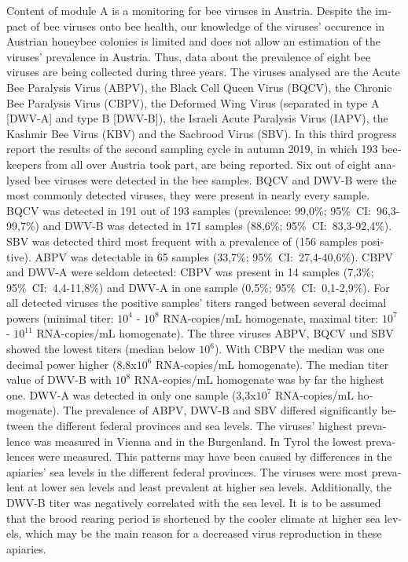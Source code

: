 \begin{otherlanguage}{english}

Content of module A is a monitoring for bee viruses in Austria. Despite the impact of bee viruses onto bee health, our knowledge of the viruses' occurence in Austrian honeybee colonies is limited and does not allow an estimation of the viruses' prevalence in Austria. Thus, data about the prevalence of eight bee viruses are being collected during three years. The viruses analysed are the Acute Bee Paralysis Virus (ABPV), the Black Cell Queen Virus (BQCV), the Chronic Bee Paralysis Virus (CBPV), the Deformed Wing Virus (separated in type A [DWV-A] and type B [DWV-B]), the Israeli Acute Paralysis Virus (IAPV), the Kashmir Bee Virus (KBV) and the Sacbrood Virus (SBV).
\newline
In this third progress report the results of the second sampling cycle in autumn 2019, in which 193 beekeepers from all over Austria took part, are being reported. Six out of eight analysed bee viruses were detected in the bee samples. BQCV and DWV-B were the most commonly detected viruses, they were present in nearly every sample. BQCV was detected in 191 out of 193 samples (prevalence: 99,0\%; 95\%~CI:~96,3-99,7\%) and DWV-B was detected in 171 samples (88,6\%; 95\%~CI:~83,3-92,4\%). SBV was detected third most frequent with a prevalence of  (156 samples positive). ABPV was detectable in 65 samples (33,7\%; 95\%~CI:~27,4-40,6\%). CBPV and DWV-A were seldom detected: CBPV was present in 14 samples (7,3\%; 95\%~CI:~4,4-11,8\%) and DWV-A in one sample (0,5\%; 95\%~CI:~0,1-2,9\%). 
\newline
For all detected viruses the positive samples' titers ranged between several decimal powers (minimal titer: $10^4$ - $10^8$ RNA-copies/\si{\milli\liter} homogenate, maximal titer: $10^7$ - $10^{11}$ RNA-copies/\si{\milli\liter} homogenate). The three viruses ABPV, BQCV und SBV showed the lowest titers (median below $10^6$). With CBPV the median was one decimal power higher (8,8x$10^6$ RNA-copies/\si{\milli\liter} homogenate). The median titer value of DWV-B with $10^8$ RNA-copies/\si{\milli\liter} homogenate was by far the highest one. DWV-A was detected in only one sample (3,3x$10^7$ RNA-copies/\si{\milli\liter} homogenate).
\newline
The prevalence of ABPV, DWV-B and SBV differed significantly between the different federal provinces and sea levels. The viruses' highest prevalence was measured in Vienna and in the Burgenland. In Tyrol the lowest prevalences were measured. This patterns may have been caused by differences in the apiaries' sea levels in the different federal provinces. The viruses were most prevalent at lower sea levels and least prevalent at higher sea levels. Additionally, the DWV-B titer was negatively correlated with the sea level. It is to be assumed that the brood rearing period is shortened by the cooler climate at higher sea levels, which may be the main reason for a decreased virus reproduction in these apiaries.

\end{otherlanguage}
